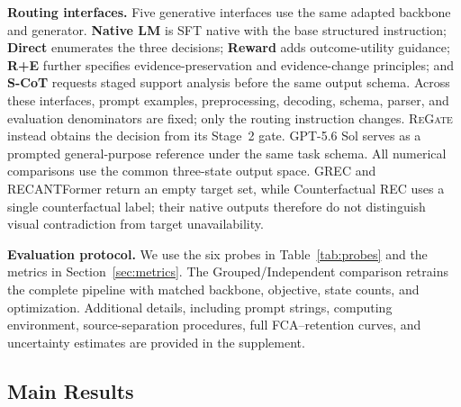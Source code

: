 \documentclass[letterpaper]{article}
\newcommand{\Method}{\textsc{ReGate}\xspace}
\begin{document}
\textbf{Routing interfaces.}
Five generative interfaces use the same adapted backbone and generator. \textbf{Native LM} is SFT native with the base structured instruction; \textbf{Direct} enumerates the three decisions; \textbf{Reward} adds outcome-utility guidance; \textbf{R+E} further specifies evidence-preservation and evidence-change principles; and \textbf{S-CoT} requests staged support analysis before the same output schema. Across these interfaces, prompt examples, preprocessing, decoding, schema, parser, and evaluation denominators are fixed; only the routing instruction changes. \Method instead obtains the decision from its Stage~2 gate. GPT-5.6 Sol serves as a prompted general-purpose reference under the same task schema.
All numerical comparisons use the common three-state output space. GREC and RECANTFormer \citep{he2023grec,hemanthage2024recantformer} 
return an empty target set, while Counterfactual REC uses a single counterfactual label; their native outputs therefore do not distinguish visual contradiction from target unavailability.

\textbf{Evaluation protocol.}
We use the six probes in Table~\ref{tab:probes} and the metrics in Section~\ref{sec:metrics}. The Grouped/Independent comparison retrains the complete pipeline with matched backbone, objective, state counts, and optimization. 
Additional details, including prompt strings, computing environment, source-separation procedures, full FCA--retention curves, and uncertainty estimates are provided in the supplement.

\subsection{Main Results}
\label{sec:fixed_point_comparison}
\end{document}
